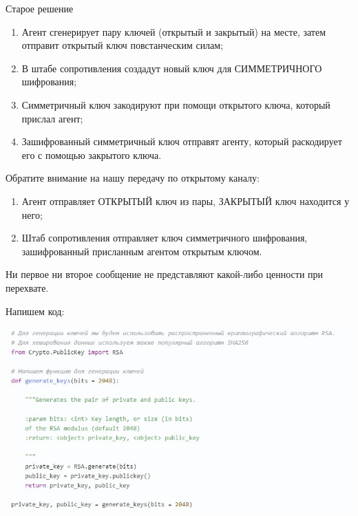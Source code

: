 \documentclass[12pt]{article}
\begin{document}
	Старое решение
	
	\vspace{1cm}
	
	\begin{enumerate}
		\item Агент сгенерирует пару ключей (открытый и закрытый) на месте, затем отправит открытый ключ повстанческим силам;
		\item В штабе сопротивления создадут новый ключ для СИММЕТРИЧНОГО шифрования;
		\item Симметричный ключ закодируют при помощи открытого ключа, который прислал агент;
		\item Зашифрованный симметричный ключ отправят агенту, который раскодирует его с помощью закрытого ключа.
	\end{enumerate}
	
	Обратите внимание на нашу передачу по открытому каналу:
	
	\begin{enumerate}
		\item Агент отправляет ОТКРЫТЫЙ ключ из пары, ЗАКРЫТЫЙ ключ находится у него;
		
		\item Штаб сопротивления отправляет ключ симметричного шифрования, зашифрованный присланным агентом открытым ключом.
	\end{enumerate}

	\vspace{1cm}
	
	Ни первое ни второе сообщение не представляют какой-либо ценности при перехвате.
	
	\vspace{1cm}
	
	Напишем код:
	
		\begin{center}
		\includegraphics[width=1\linewidth]{pictures/code5.jpg}
	\end{center}
\end{document}
